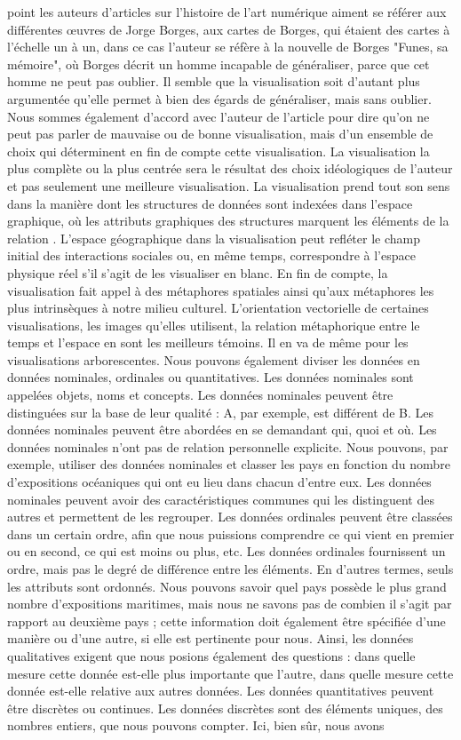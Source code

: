 \documentclass[a4paper, twoside, 12pt]{book}
\begin{document}
point les auteurs d'articles sur l'histoire de l'art numérique aiment se référer aux différentes œuvres de Jorge Borges, aux cartes de Borges, qui étaient des cartes à l'échelle un à un, dans ce cas l'auteur se réfère à la nouvelle de Borges "Funes, sa mémoire", où Borges décrit un homme incapable de généraliser, parce que cet homme ne peut pas oublier. Il semble que la visualisation soit d'autant plus argumentée qu'elle permet à bien des égards de généraliser, mais sans oublier. Nous sommes également d'accord avec l'auteur de l'article pour dire qu'on ne peut pas parler de mauvaise ou de bonne visualisation, mais d'un ensemble de choix qui déterminent en fin de compte cette visualisation. La visualisation la plus complète ou la plus centrée sera le résultat des choix idéologiques de l'auteur et pas seulement une meilleure visualisation. La visualisation prend tout son sens dans la manière dont les structures de données sont indexées dans l'espace graphique, où les attributs graphiques des structures marquent les éléments de la relation . L'espace géographique dans la visualisation peut refléter le champ initial des interactions sociales ou, en même temps, correspondre à l'espace physique réel s'il s'agit de les visualiser en blanc. En fin de compte, la visualisation fait appel à des métaphores spatiales ainsi qu'aux métaphores les plus intrinsèques à notre milieu culturel. L'orientation vectorielle de certaines visualisations, les images qu'elles utilisent, la relation métaphorique entre le temps et l'espace en sont les meilleurs témoins. Il en va de même pour les visualisations arborescentes. Nous pouvons également diviser les données en données nominales, ordinales ou quantitatives. Les données nominales sont appelées objets, noms et concepts. Les données nominales peuvent être distinguées sur la base de leur qualité : A, par exemple, est différent de B. Les données nominales peuvent être abordées en se demandant qui, quoi et où. Les données nominales n'ont pas de relation personnelle explicite. Nous pouvons, par exemple, utiliser des données nominales et classer les pays en fonction du nombre d'expositions océaniques qui ont eu lieu dans chacun d'entre eux. Les données nominales peuvent avoir des caractéristiques communes qui les distinguent des autres et permettent de les regrouper. Les données ordinales peuvent être classées dans un certain ordre, afin que nous puissions comprendre ce qui vient en premier ou en second, ce qui est moins ou plus, etc. Les données ordinales fournissent un ordre, mais pas le degré de différence entre les éléments. En d'autres termes, seuls les attributs sont ordonnés. Nous pouvons savoir quel pays possède le plus grand nombre d'expositions maritimes, mais nous ne savons pas de combien il s'agit par rapport au deuxième pays ; cette information doit également être spécifiée d'une manière ou d'une autre, si elle est pertinente pour nous. Ainsi, les données qualitatives exigent que nous posions également des questions : dans quelle mesure cette donnée est-elle plus importante que l'autre, dans quelle mesure cette donnée est-elle relative aux autres données. Les données quantitatives peuvent être discrètes ou continues. Les données discrètes sont des éléments uniques, des nombres entiers, que nous pouvons compter. Ici, bien sûr, nous avons 
\end{document}
